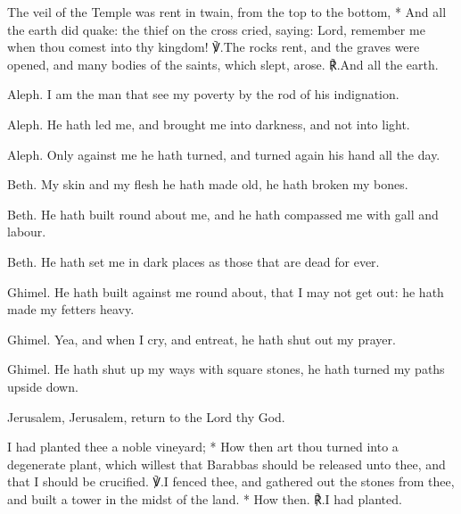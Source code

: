 \documentclass[12pt]{book}
\begin{document}
\begin{enpars}
The veil of the Temple was rent in twain, from the top to the bottom,
* And all the earth did quake: the thief on the cross cried, saying: Lord, remember me when thou comest into thy kingdom!
℣.\@  The rocks rent, and the graves were opened, and many bodies of the saints, which slept, arose.
℟.\@  And all the earth.
\end{enpars}

\begin{enpars}
Aleph. I am the man that see my poverty by the rod of his indignation.

Aleph. He hath led me, and brought me into darkness, and not into light.

Aleph. Only against me he hath turned, and turned again his hand all the day.

Beth. My skin and my flesh he hath made old, he hath broken my bones.

Beth. He hath built round about me, and he hath compassed me with gall and labour.

Beth. He hath set me in dark places as those that are dead for ever.

Ghimel. He hath built against me round about, that I may not get out: he hath made my fetters heavy.

Ghimel. Yea, and when I cry, and entreat, he hath shut out my prayer.

Ghimel. He hath shut up my ways with square stones, he hath turned my paths upside down.

Jerusalem, Jerusalem, return to the Lord thy God.
\end{enpars}


\begin{enpars}
I had planted thee a noble vineyard;
* How then art thou turned into a degenerate plant, which willest that Barabbas should be released unto thee, and that I should be crucified.
℣.\@  I fenced thee, and gathered out the stones from thee, and built a tower in the midst of the land.
* How then.
℟.\@  I had planted.
\end{enpars}


\end{document}
